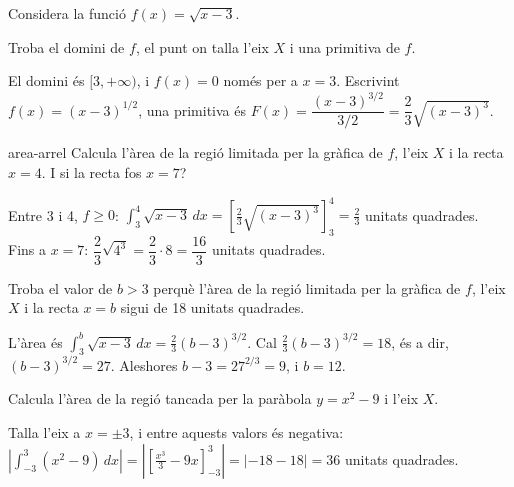 Considera la funció $f(x)=\sqrt{x-3}$.

\begin{apartats}

Troba el domini de $f$, el punt on talla l'eix $X$ i una primitiva de $f$.

\begin{solucio}
El domini és $[3,+\infty)$, i $f(x)=0$ només per a $x=3$. Escrivint $f(x)=(x-3)^{1/2}$, una primitiva és
$F(x)=\dfrac{(x-3)^{3/2}}{3/2}=\dfrac23\sqrt{(x-3)^3}$.
\end{solucio}

\begin{tria}{area-arrel}
Calcula l'àrea de la regió limitada per la gràfica de $f$, l'eix $X$ i la recta $x=4$. I si la recta
fos $x=7$?

\begin{solucio}
Entre 3 i 4, $f\ge0$: $\displaystyle\int_3^4\sqrt{x-3}\,dx=\left[\frac23\sqrt{(x-3)^3}\right]_3^4=\frac23$
unitats quadrades.\\
Fins a $x=7$: $\dfrac23\sqrt{4^3}=\dfrac23\cdot8=\dfrac{16}3$ unitats quadrades.
\end{solucio}

Troba el valor de $b>3$ perquè l'àrea de la regió limitada per la gràfica de $f$, l'eix $X$ i la recta
$x=b$ sigui de 18 unitats quadrades.

\begin{solucio}
L'àrea és $\displaystyle\int_3^b\sqrt{x-3}\,dx=\frac23(b-3)^{3/2}$. Cal $\frac23(b-3)^{3/2}=18$, és a dir,
$(b-3)^{3/2}=27$. Aleshores $b-3=27^{2/3}=9$, i $b=12$.
\end{solucio}
\end{tria}

\begin{nomesllarg}
Calcula l'àrea de la regió tancada per la paràbola $y=x^2-9$ i l'eix $X$.

\begin{solucio}
Talla l'eix a $x=\pm3$, i entre aquests valors és negativa:
$\left|\displaystyle\int_{-3}^3(x^2-9)\,dx\right|=\left|\left[\frac{x^3}3-9x\right]_{-3}^3\right|=|-18-18|=36$
unitats quadrades.
\end{solucio}
\end{nomesllarg}

\end{apartats}

